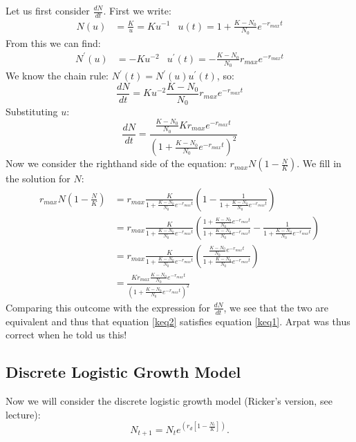 \documentclass{article}\usepackage[]{graphicx}\usepackage[]{color}
\begin{document}
\begin{Answer}[ref=kloge1]
Let us first consider $\frac{dN}{dt}$. First we write:
\begin{align*}
N(u) &= \frac{K}{u} = Ku^{-1} & u(t) = 1+\frac{K-N_0}{N_0}e^{-r_{max}t}
\end{align*}
From this we can find:
\begin{align*}
N^\prime(u) &= - K u^{-2} & u^\prime(t) = -\frac{K-N_0}{N_0}r_{max}e^{-r_{max}t} 
\end{align*}
We know the chain rule: $N^\prime(t) = N^\prime(u) u^\prime(t)$, so:
\begin{equation*}
\frac{dN}{dt} = K u^{-2} \frac{K-N_0}{N_0}r_{max}e^{-r_{max}t} 
\end{equation*}
Substituting $u$:
\begin{equation*}
\frac{dN}{dt} = \frac{\frac{K-N_0}{N_0} K r_{max}e^{-r_{max}t}}{(1+\frac{K-N_0}{N_0}e^{-r_{max}t})^{2}} 
\end{equation*}
Now we consider the righthand side of the equation: $r_{max} N \left( 1-\frac{N}{K}\right) $. We fill in the solution for $N$:
\begin{align*}
r_{max} N \left( 1-\frac{N}{K}\right) &= r_{max} \frac{K}{1+\frac{K-N_0}{N_0}e^{-r_{max}t}} \left( 1-\frac{1}{1+\frac{K-N_0}{N_0}e^{-r_{max}t}}\right) \\ &= r_{max} \frac{K}{1+\frac{K-N_0}{N_0}e^{-r_{max}t}} \left( \frac{1+\frac{K-N_0}{N_0}e^{-r_{max}t}}{1+\frac{K-N_0}{N_0}e^{-r_{max}t}}-\frac{1}{1+\frac{K-N_0}{N_0}e^{-r_{max}t}}\right)\\ &= r_{max} \frac{K}{1+\frac{K-N_0}{N_0}e^{-r_{max}t}} \left( \frac{\frac{K-N_0}{N_0}e^{-r_{max}t}}{1+\frac{K-N_0}{N_0}e^{-r_{max}t}}\right)\\ &= \frac{K r_{max}\frac{K-N_0}{N_0}e^{-r_{max}t}}{(1+\frac{K-N_0}{N_0}e^{-r_{max}t})^2}
\end{align*}
Comparing this outcome with the expression for $\frac{dN}{dt}$, we see that the two are equivalent and thus that equation \ref{keq2} satisfies equation \ref{keq1}. Arpat was thus correct when he told us this!
\vspace{1.5ex}
\end{Answer}
\subsection{Discrete Logistic Growth Model}
Now we will consider the discrete logistic growth model (Ricker's version, see lecture):
\begin{equation}
N_{t+1} = N_t e^{\left(r_{d}\left[1-\frac{N_t}{K}\right]\right)}.
\end{equation}
\end{document}
